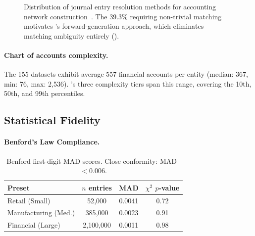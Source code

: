 \begin{figure}[t]
\centering
{}
\caption{Distribution of journal entry resolution methods for
  accounting network construction~\citep{ivertowski2024hardware}.
  The 39.3\% requiring non-trivial matching motivates \system{}'s
  forward-generation approach, which eliminates matching ambiguity
  entirely ().}
\label{fig:solving_methods}
\end{figure}

\paragraph{Chart of accounts complexity.}
The 155 datasets exhibit average 557 financial accounts per entity
(median: 367, min: 76, max: 2{,}536).  \system{}'s three complexity
tiers span this range, covering the 10th, 50th, and 99th percentiles.

\subsection{Statistical Fidelity}
\label{sec:exp_statistical}

\paragraph{Benford's Law Compliance.}

\begin{table}[t]
\centering
\caption{Benford first-digit MAD scores.  Close conformity: MAD~$< 0.006$.}
\label{tab:benford_results}
\small
\begin{tabular}{lccc}
\toprule
\textbf{Preset} & \textbf{$n$ entries} & \textbf{MAD}
  & \textbf{$\chi^2$ $p$-value} \\
\midrule
Retail (Small)       & 52{,}000   & 0.0041 & 0.72 \\
Manufacturing (Med.) & 385{,}000  & 0.0023 & 0.91 \\
Financial (Large)    & 2{,}100{,}000 & 0.0011 & 0.98 \\
\bottomrule
\end{tabular}
\end{table}

